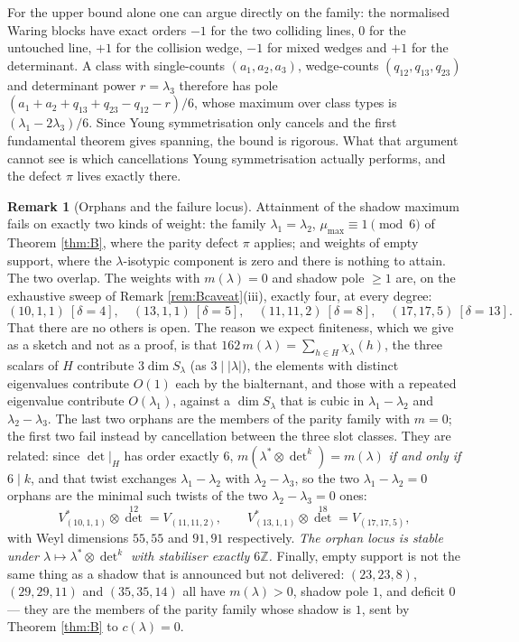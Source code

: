 \documentclass[11pt,reqno]{amsart}
\theoremstyle{plain}
\theoremstyle{definition}
\newtheorem{remark}[theorem]{Remark}
\newcommand{\bZ}{\mathbb{Z}}
\begin{document}
For the upper bound alone one can argue directly on the family: the normalised
Waring blocks have exact orders
$-1$ for the two colliding lines, $0$ for the untouched line, $+1$ for the
collision wedge, $-1$ for mixed wedges and $+1$ for the determinant.  A class
with single-counts $(a_1,a_2,a_3)$, wedge-counts $(q_{12},q_{13},q_{23})$ and
determinant power $r=\lambda_3$ therefore has pole
$(a_1+a_2+q_{13}+q_{23}-q_{12}-r)/6$, whose maximum over class types is
$(\lambda_1-2\lambda_3)/6$.  Since Young symmetrisation only cancels and the
first fundamental theorem gives spanning, the bound is rigorous.  What that
argument cannot see is which cancellations Young symmetrisation actually
performs, and the defect $\pi$ lives exactly there.

\begin{remark}[Orphans and the failure locus]\label{rem:orphan}
Attainment of the shadow maximum fails on exactly two kinds of weight: the
family $\lambda_1=\lambda_2$, $\mu_{\max}\equiv1\pmod6$ of Theorem \ref{thm:B},
where the parity defect $\pi$ applies; and weights of empty support, where the
$\lambda$-isotypic component is zero and there is nothing to attain.  The two
overlap.  The weights with $m(\lambda)=0$ and shadow pole $\ge1$ are, on the
exhaustive sweep of Remark \ref{rem:Bcaveat}(iii), exactly four, at every
degree:
\[
  (10,1,1)\ [\delta=4],\quad (13,1,1)\ [\delta=5],\quad
  (11,11,2)\ [\delta=8],\quad (17,17,5)\ [\delta=13].
\]
That there are no others is open.  The reason we expect finiteness, which we
give as a sketch and not as a proof, is that $162\,m(\lambda)=\sum_{h\in
H}\chi_\lambda(h)$, the
three scalars of $H$ contribute $3\dim S_\lambda$ (as $3\mid|\lambda|$), the
elements with distinct eigenvalues contribute $O(1)$ each by the bialternant,
and those with a repeated eigenvalue contribute $O(\lambda_1)$, against a
$\dim S_\lambda$ that is cubic in $\lambda_1-\lambda_2$ and $\lambda_2-\lambda_3$.
The last two orphans are the members of the parity family with $m=0$; the first
two fail instead by cancellation between the three slot classes.  They are
related: since $\det|_H$ has order exactly $6$,
$m(\lambda^{*}\otimes\det^{k})=m(\lambda)$ \emph{if and only if} $6\mid k$, and
that twist exchanges $\lambda_1-\lambda_2$ with $\lambda_2-\lambda_3$, so the two
$\lambda_1-\lambda_2=0$ orphans are the minimal such twists of the two
$\lambda_2-\lambda_3=0$ ones:
\[
  V_{(10,1,1)}^{*}\otimes\det^{12}=V_{(11,11,2)},
  \qquad
  V_{(13,1,1)}^{*}\otimes\det^{18}=V_{(17,17,5)},
\]
with Weyl dimensions $55,55$ and $91,91$ respectively.  \emph{The orphan locus
is stable under $\lambda\mapsto\lambda^{*}\otimes\det^{k}$ with stabiliser
exactly $6\bZ$.}  Finally, empty support is not the same thing as a shadow that
is announced but not delivered: $(23,23,8)$, $(29,29,11)$ and $(35,35,14)$ all
have $m(\lambda)>0$, shadow pole $1$, and deficit $0$ --- they are the members of
the parity family whose shadow is $1$, sent by Theorem \ref{thm:B} to
$c(\lambda)=0$.
\end{remark}
\end{document}
